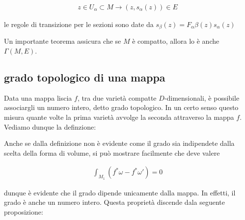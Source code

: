 \documentclass{report}
\begin{document}
\begin{align}
    z \in U_\alpha \subset M \rightarrow (z, s_\alpha(z)) \in E
\end{align}

le regole di transizione per le sezioni sono date da \(s_\beta(z) = F_\alpha\beta (z)s_\alpha (z)\)

Un importante teorema assicura che se \(M\) è compatto, allora lo è anche \(\Gamma(M, E)\). 

\subsection{grado topologico di una mappa}

Data una mappa liscia \(f\), tra due varietà compatte \(D\)-dimensionali, è possibile associargli un numero intero, detto grado topologico. In un certo senso questo misura quante volte la prima varietà avvolge la seconda attraverso la mappa \(f\). Vediamo dunque la definzione: 


Anche se dalla definizione non è evidente come il grado sia indipendete dalla scelta della forma di volume, si può mostrare facilmente che deve valere 

\begin{align}
    \int_{M_1}(f^*\omega - f^*\omega') = 0
\end{align}

dunque è evidente che il grado dipende unicamente dalla mappa. In effetti, il grado è anche un numero intero. Questa proprietà discende dala seguente proposizione: 

\end{document}
